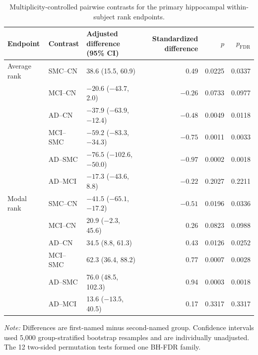 \documentclass{article}
\begin{document}
\begin{table}[!htbp]
\color{blue}
\centering
\caption{Multiplicity-controlled pairwise contrasts for the primary hippocampal within-subject rank endpoints.}
\label{tab:primary_pairwise_contrasts}
\scriptsize
\begin{tabular}{lllrrr}
\toprule
Endpoint & Contrast & Adjusted difference (95\% CI) & Standardized difference & $p$ & $p_{\mathrm{FDR}}$\\
\midrule
Average rank & SMC--CN & 38.6 (15.5, 60.9) & 0.49 & 0.0225 & 0.0337\\
& MCI--CN & $-20.6$ ($-43.7$, 2.0) & $-0.26$ & 0.0733 & 0.0977\\
& AD--CN & $-37.9$ ($-63.9$, $-12.4$) & $-0.48$ & 0.0049 & 0.0118\\
& MCI--SMC & $-59.2$ ($-83.3$, $-34.3$) & $-0.75$ & 0.0011 & 0.0033\\
& AD--SMC & $-76.5$ ($-102.6$, $-50.0$) & $-0.97$ & 0.0002 & 0.0018\\
& AD--MCI & $-17.3$ ($-43.6$, 8.8) & $-0.22$ & 0.2027 & 0.2211\\
\addlinespace
Modal rank & SMC--CN & $-41.5$ ($-65.1$, $-17.2$) & $-0.51$ & 0.0196 & 0.0336\\
& MCI--CN & 20.9 ($-2.3$, 45.6) & 0.26 & 0.0823 & 0.0988\\
& AD--CN & 34.5 (8.8, 61.3) & 0.43 & 0.0126 & 0.0252\\
& MCI--SMC & 62.3 (36.4, 88.2) & 0.77 & 0.0007 & 0.0028\\
& AD--SMC & 76.0 (48.5, 102.3) & 0.94 & 0.0003 & 0.0018\\
& AD--MCI & 13.6 ($-13.5$, 40.5) & 0.17 & 0.3317 & 0.3317\\
\bottomrule
\end{tabular}
\par\vspace{1mm}
\footnotesize{\textit{Note:} Differences are first-named minus second-named group. Confidence intervals used 5,000 group-stratified bootstrap resamples and are individually unadjusted. The 12 two-sided permutation tests formed one BH-FDR family.}
\end{table}
\end{document}

